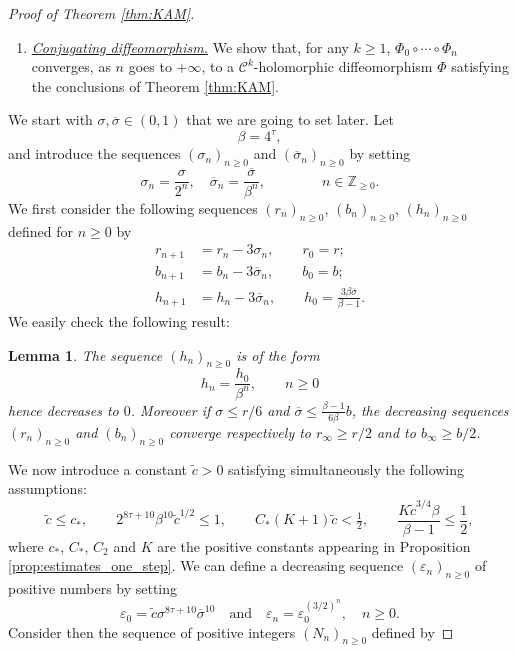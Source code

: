 \documentclass[10pt,a4paper]{amsart}
\newtheorem{lemma}{Lemma}
\newcommand{\Z}{\mathbb{Z}}
\begin{document}
\begin{proof}[Proof of Theorem \ref{thm:KAM}]
\begin{enumerate}
    \item {\it\underline{Conjugating diffeomorphism.}} We show that, for any $k \geq 1$, $\Phi_0\circ\cdots\circ\Phi_n$ converges, as $n$ goes to $+\infty$, to a $\mathscr C^{k}$-holomorphic diffeomorphism $\Phi$ satisfying the conclusions of Theorem \ref{thm:KAM}.
\end{enumerate}

\vspace{0.2cm}
We start with $\sigma,\overline\sigma\in(0,1)$ that we are going to set later. Let 
\[
\beta = 4^\tau,
\]
and introduce the sequences $(\sigma_n)_{n\geq 0}$ and $(\overline\sigma_n)_{n\geq 0}$ by setting
\[
\sigma_n = \frac{\sigma}{2^n},
\quad
\overline\sigma_n = \frac{\overline\sigma}{\beta^n},
\qquad\qquad n\in\Z_{\geq 0}.
\]
We first consider the following sequences $(r_n)_{n\geq 0}$, $(b_n)_{n\geq 0}$, $(h_n)_{n\geq 0}$ defined for $n\geq 0$ by
\begin{align*}
r_{n+1} & =  r_n-3\sigma_n, \qquad r_0=r;\\
b_{n+1} & =  b_n-3\overline\sigma_n, \qquad b_0=b;\\
h_{n+1} & =  h_n-3\overline\sigma_n, \qquad h_0=\tfrac{3\beta\overline\sigma}{\beta-1}.
\end{align*}
We easily check the following result:
\begin{lemma}
    \label{lemma:prop_seq_strips}
    The sequence $(h_n)_{n\geq 0}$ is of the form
    \[
    h_n = \frac{h_0}{\beta^n},\qquad n\geq 0
    \]
    hence decreases to $0$.
    Moreover if $\sigma\leq r/6$ and $\overline\sigma\leq \frac{\beta-1}{6\beta}b$, the decreasing sequences $(r_n)_{n\geq 0}$ and $(b_n)_{n\geq 0}$ converge respectively to $r_\infty\geq r/2$ and to $b_\infty\geq b/2$.
\end{lemma}

We now introduce a constant $\tilde c>0$ satisfying simultaneously the following assumptions:
\begin{equation}
    \label{eq:tilde_c}
    \tilde c\leq c_\ast,
    \qquad
    2^{8\tau+10}\beta^{10}\tilde c^{1/2}\leq 1,
    \qquad
    C_\ast(K+1)\tilde c < \tfrac{1}{2},
    \qquad
    \frac{K\tilde c^{3/4}\beta}{\beta-1}\leq\frac{1}{2},
\end{equation}
where $c_\ast$, $C_\ast$, $C_2$ and $K$ are the positive constants appearing in Proposition \ref{prop:estimates_one_step}.
We can define a decreasing sequence $(\varepsilon_n)_{n\geq0}$ of positive numbers by setting
\[
\varepsilon_0 = \tilde c\sigma^{8\tau+10}\overline\sigma^{10}
\quad\text{and}\quad 
\varepsilon_n = \varepsilon_0^{(3/2)^n},
\quad n\geq 0.
\]
Consider then the sequence of positive integers 
$(N_n)_{n\geq 0}$ defined by 


\end{proof}
\end{document}
